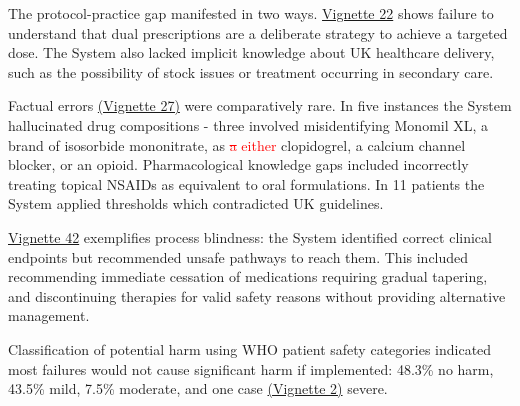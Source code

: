 \documentclass[12pt]{article}
\newcommand{\added}[1]{\textcolor{red}{#1}}
\newcommand{\removed}[1]{\textcolor{red}{\sout{#1}}}
\begin{document}
The protocol-practice gap manifested in two ways. \hyperlink{vignette-22}{Vignette 22} shows failure to understand that dual prescriptions are a deliberate strategy to achieve a targeted dose. The System also lacked implicit knowledge about UK healthcare delivery, such as the possibility of stock issues or treatment occurring in secondary care.

Factual errors \hyperlink{vignette-27}{(Vignette 27)} were comparatively rare. In five instances the System hallucinated drug compositions - three involved misidentifying Monomil XL, a brand of isosorbide mononitrate, as \removed{a} \added{either} clopidogrel, a calcium channel blocker, or an opioid. Pharmacological knowledge gaps included incorrectly treating topical NSAIDs as equivalent to oral formulations. In 11 patients the System applied thresholds which contradicted UK guidelines.

\hyperlink{vignette-42}{Vignette 42} exemplifies process blindness: the System identified correct clinical endpoints but recommended unsafe pathways to reach them. This included recommending immediate cessation of medications requiring gradual tapering, and discontinuing therapies for valid safety reasons without providing alternative management.

Classification of potential harm using WHO patient safety categories indicated most failures would not cause significant harm if implemented: 48.3\% no harm, 43.5\% mild, 7.5\% moderate, and one case \hyperlink{vignette-2}{(Vignette 2)} severe.
\end{document}
